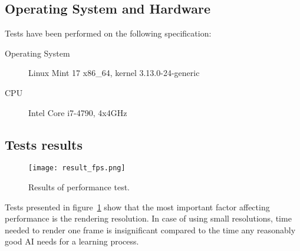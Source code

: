 	\subsection{Operating System and Hardware}
	
	Tests have been performed on the following specification:
	
	\begin{description}
		\item[Operating System] Linux Mint 17 x86\_64, kernel 3.13.0-24-generic
		\item[CPU] Intel Core i7-4790, 4x4GHz
	\end{description}

\subsection{Tests results}

\begin{figure}
\centering
\texttt{[image: result\_fps.png]}
\caption{Results of performance test.}
\label{fig:fps_test}
\end{figure}

Tests presented in figure~\ref{fig:fps_test} show that the most important factor affecting performance is the rendering resolution. In case of using small resolutions, time needed to render one frame is insignificant compared to the time any reasonably good AI needs for a learning process.



